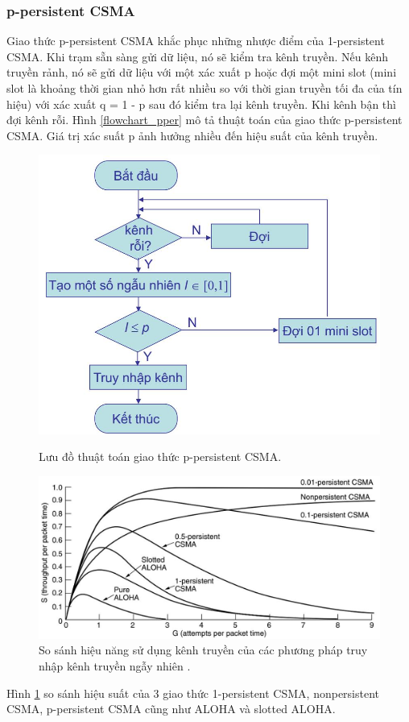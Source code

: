 \subsubsection{p-persistent CSMA}
Giao thức p-persistent CSMA \cite{6} khắc phục những nhược điểm của 1-persistent CSMA. Khi trạm sẵn sàng gửi dữ liệu, nó sẽ kiểm tra kênh truyền. Nếu kênh truyền rảnh, nó sẽ gửi dữ liệu với một xác xuất p hoặc đợi một mini slot (mini slot là khoảng thời gian nhỏ hơn rất nhiều so với thời gian truyền tối đa của tín hiệu) với xác xuất q = 1 - p sau đó kiểm tra lại kênh truyền. Khi kênh bận thì đợi kênh rỗi. Hình \ref{flowchart_pper} mô tả thuật toán của giao thức p-persistent CSMA. Giá trị xác suất p ảnh hưởng nhiều đến hiệu suất của kênh truyền.
\begin{figure}[h]
\begin{center}
\includegraphics[scale=0.45]{image/flowchart_pper}
\end{center}
\caption{Lưu đồ thuật toán giao thức p-persistent CSMA.}
\label{flowchart_pper}
\begin{center}
\includegraphics[scale=0.48]{image/compare}
\end{center}
\caption{So sánh hiệu năng sử dụng kênh truyền của các phương pháp truy nhập kênh truyền ngẫy nhiên \cite{6}{}.}
\label{compare}
\end{figure}
\par
Hình \ref{compare} so sánh hiệu suất của 3 giao thức 1-persistent CSMA, nonpersistent CSMA, p-persistent CSMA cũng như ALOHA và slotted ALOHA.
